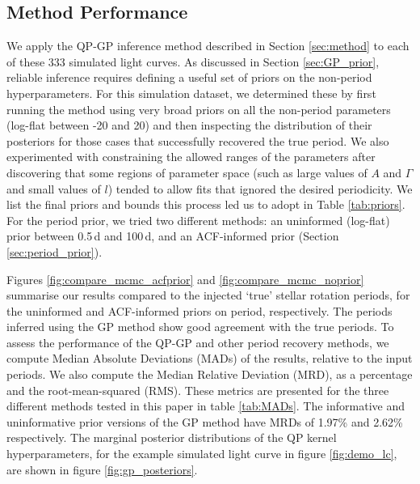 \documentclass[a4paper,fleqn,usenatbib,useAMS]{mnras}
\newcommand{\percentgpMAD}{1.97}
\newcommand{\percentgpMADnp}{2.62}
\newcommand{\vrcomment}[1]{{\color{magenta}#1}}
\begin{document}
\subsection{Method Performance}
\label{sec:performance}

We apply the QP-GP inference method described in Section \ref{sec:method}
to each of these 333 simulated light curves.  As discussed in Section
\ref{sec:GP_prior}, reliable inference
requires defining a useful set of priors on the non-period
hyperparameters.
For this simulation dataset, we determined these by first running
the method using very broad priors on all the non-period parameters
(log-flat between -20 and 20)
and then inspecting the distribution of their posteriors for those cases
that successfully recovered the true period.
We also experimented with constraining the allowed ranges of the parameters
after discovering that some regions of parameter space (such as large values
of $A$ and $\Gamma$ and small values of $l$) tended to allow fits that ignored
the desired periodicity.
We list the final priors and bounds this process led us to adopt
in Table \ref{tab:priors}.
For the period prior, we tried two different methods: an uninformed (log-flat)
prior between 0.5\,d and 100\,d, and an ACF-informed prior
(Section \ref{sec:period_prior}).

Figures \ref{fig:compare_mcmc_acfprior} and \ref{fig:compare_mcmc_noprior}
summarise our results compared to the injected `true' stellar rotation
periods, for the uninformed and ACF-informed priors on period, respectively.
The periods inferred using the GP method show good agreement with the true
periods.
To assess the performance of the QP-GP and other period recovery methods, we
compute Median Absolute Deviations (MADs) of the results, relative to the
input periods.
We also compute the Median Relative Deviation (MRD), as a percentage and the
root-mean-squared (RMS).
These metrics are presented for the three different methods tested in this
paper in table \ref{tab:MADs}.
The informative and uninformative prior versions of the GP method have MRDs of
\percentgpMAD \% and \percentgpMADnp \% respectively.
The marginal posterior distributions of the QP kernel hyperparameters, for the
example simulated light curve in figure \ref{fig:demo_lc}, are shown in
figure \ref{fig:gp_posteriors}.
\end{document}
